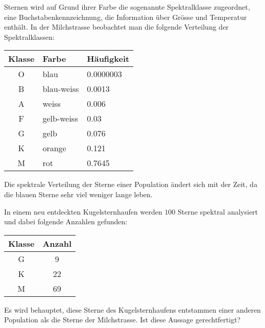 Sternen wird auf Grund ihrer Farbe die sogenannte Spektralklasse zugeordnet,
eine Buchstabenkennzeichnung, die Information über Grösse und Temperatur
enthält.
In der Milchstrasse beobachtet man die folgende Verteilung
der Spektralklassen:
\begin{center}
\begin{tabular}{|c|l|l|}
\hline
Klasse&Farbe     &Häufigkeit\\
\hline
O     &blau      &0.0000003\\
B     &blau-weiss&0.0013\\
A     &weiss     &0.006\\
F     &gelb-weiss&0.03\\
G     &gelb      &0.076\\
K     &orange    &0.121\\
M     &rot       &0.7645\\
\hline
\end{tabular}
\end{center}
Die spektrale Verteilung der Sterne einer Population ändert sich mit der
Zeit, da die blauen Sterne sehr viel weniger lange leben.

In einem neu entdeckten Kugelsternhaufen werden $100$ Sterne spektral
analysiert und dabei folgende Anzahlen gefunden:
\begin{center}
\begin{tabular}{|c|c|}
\hline
Klasse&Anzahl\\
\hline
G&9\\
K&22\\
M&69\\
\hline
\end{tabular}
\end{center}
Es wird behauptet, diese Sterne des Kugelsternhaufens entstammen einer
anderen Population als die Sterne der Milchstrasse.
Ist diese Aussage gerechtfertigt?

